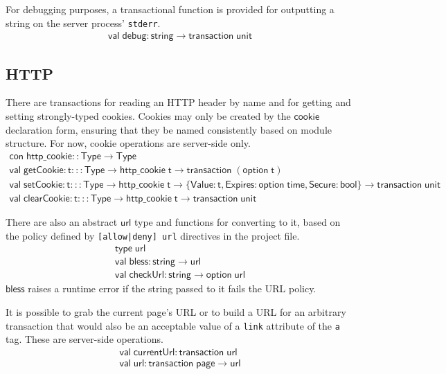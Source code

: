\documentclass{article}
\newcommand{\mt}[1]{\mathsf{#1}}
\begin{document}
For debugging purposes, a transactional function is provided for outputting a string on the server process' \texttt{stderr}.
$$\begin{array}{l}
  \mt{val} \; \mt{debug} : \mt{string} \to \mt{transaction} \; \mt{unit}
\end{array}$$

\subsection{HTTP}

There are transactions for reading an HTTP header by name and for getting and setting strongly-typed cookies.  Cookies may only be created by the $\mt{cookie}$ declaration form, ensuring that they be named consistently based on module structure.  For now, cookie operations are server-side only.
$$\begin{array}{l}
  \mt{con} \; \mt{http\_cookie} :: \mt{Type} \to \mt{Type} \\
  \mt{val} \; \mt{getCookie} : \mt{t} ::: \mt{Type} \to \mt{http\_cookie} \; \mt{t} \to \mt{transaction} \; (\mt{option} \; \mt{t}) \\
  \mt{val} \; \mt{setCookie} : \mt{t} ::: \mt{Type} \to \mt{http\_cookie} \; \mt{t} \to \{\mt{Value} : \mt{t}, \mt{Expires} : \mt{option} \; \mt{time}, \mt{Secure} : \mt{bool}\} \to \mt{transaction} \; \mt{unit} \\
  \mt{val} \; \mt{clearCookie} : \mt{t} ::: \mt{Type} \to \mt{http\_cookie} \; \mt{t} \to \mt{transaction} \; \mt{unit}
\end{array}$$

There are also an abstract $\mt{url}$ type and functions for converting to it, based on the policy defined by \texttt{[allow|deny] url} directives in the project file.
$$\begin{array}{l}
  \mt{type} \; \mt{url} \\
  \mt{val} \; \mt{bless} : \mt{string} \to \mt{url} \\
  \mt{val} \; \mt{checkUrl} : \mt{string} \to \mt{option} \; \mt{url}
\end{array}$$
$\mt{bless}$ raises a runtime error if the string passed to it fails the URL policy.

It is possible to grab the current page's URL or to build a URL for an arbitrary transaction that would also be an acceptable value of a \texttt{link} attribute of the \texttt{a} tag.  These are server-side operations.
$$\begin{array}{l}
  \mt{val} \; \mt{currentUrl} : \mt{transaction} \; \mt{url} \\
  \mt{val} \; \mt{url} : \mt{transaction} \; \mt{page} \to \mt{url}
\end{array}$$
\end{document}
